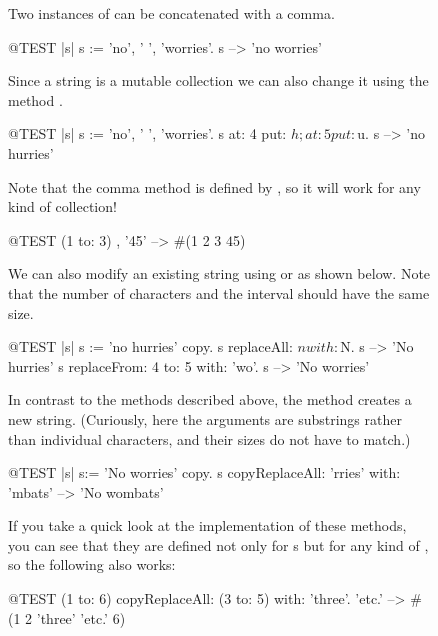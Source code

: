\documentclass[a4paper,10pt,twoside]{book}
\begin{document}
\begin{figure}
\begin{center}
Two instances of  can be concatenated with a comma.
\begin{code}{@TEST |s|}
s := 'no', ' ', 'worries'.
s -->  'no worries'
\end{code}

Since a string is a mutable collection we can also change it using the method .

\begin{code}{@TEST |s| s := 'no', ' ', 'worries'.}
s at: 4 put: $h; at: 5 put: $u.
s --> 'no hurries'
\end{code}

Note that the comma method is defined by , so it will work for any kind of collection!
\begin{code}{@TEST}
(1 to: 3) , '45' --> #(1 2 3 $4 $5)
\end{code}

We can also modify an existing string using  or  as shown below. Note that the number of characters and the interval should have the same size.

\begin{code}{@TEST |s| s := 'no hurries' copy.}
s replaceAll: $n with: $N.
s --> 'No hurries'
s replaceFrom: 4 to: 5 with: 'wo'.
s --> 'No worries'
\end{code}

In contrast to the methods described above, the method  creates a new string.
(Curiously, here the arguments are substrings rather than individual characters, and their sizes do not have to match.)

\begin{code}{@TEST |s| s:= 'No worries' copy.}
s copyReplaceAll: 'rries' with: 'mbats' --> 'No wombats'
\end{code}

If you take a quick look at the implementation of these methods, you can see that they are defined not only for s but for any kind of , so the following also works:

\begin{code}{@TEST}
(1 to: 6) copyReplaceAll: (3 to: 5) with: { 'three'. 'etc.' } --> #(1 2 'three' 'etc.' 6)
\end{code}


\end{center}
\end{figure}
\end{document}
